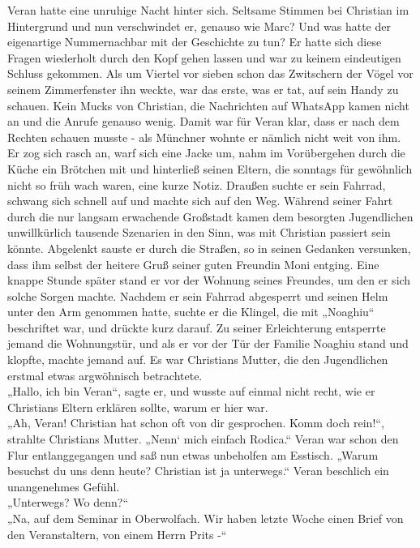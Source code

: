 \documentclass[oneside]{memoir}
\begin{document}
Veran hatte eine unruhige Nacht hinter sich. Seltsame Stimmen bei Christian im Hintergrund und nun verschwindet er, genauso wie Marc? Und was hatte der eigenartige Nummernachbar mit der Geschichte zu tun? Er hatte sich diese Fragen wiederholt durch den Kopf gehen lassen und war zu keinem eindeutigen Schluss gekommen. Als um Viertel vor sieben schon das Zwitschern der Vögel vor seinem Zimmerfenster ihn weckte, war das erste, was er tat, auf sein Handy zu schauen. Kein Mucks von Christian, die Nachrichten auf WhatsApp kamen nicht an und die Anrufe genauso wenig. Damit war für Veran klar, dass er nach dem Rechten schauen musste - als Münchner wohnte er nämlich nicht weit von ihm. Er zog sich rasch an, warf sich eine Jacke um, nahm im Vorübergehen durch die Küche ein Brötchen mit und hinterließ seinen Eltern, die sonntags für gewöhnlich nicht so früh wach waren, eine kurze Notiz. Draußen suchte er sein Fahrrad, schwang sich schnell auf und machte sich auf den Weg. Während seiner Fahrt durch die nur langsam erwachende Großstadt kamen dem besorgten Jugendlichen unwillkürlich tausende Szenarien in den Sinn, was mit Christian passiert sein könnte. Abgelenkt sauste er durch die Straßen, so in seinen Gedanken versunken, dass ihm selbst der heitere Gruß seiner guten Freundin Moni entging. Eine knappe Stunde später stand er vor der Wohnung seines Freundes, um den er sich solche Sorgen machte. Nachdem er sein Fahrrad abgesperrt und seinen Helm unter den Arm genommen hatte, suchte er die Klingel, die mit „Noaghiu“ beschriftet war, und drückte kurz darauf. Zu seiner Erleichterung entsperrte jemand die Wohnungstür, und als er vor der Tür der Familie Noaghiu stand und klopfte, machte jemand auf. Es war Christians Mutter, die den Jugendlichen erstmal etwas argwöhnisch betrachtete. \\
„Hallo, ich bin Veran“, sagte er, und wusste auf einmal nicht recht, wie er Christians Eltern erklären sollte, warum er hier war. \\
„Ah, Veran! Christian hat schon oft von dir gesprochen. Komm doch rein!“, strahlte Christians Mutter. „Nenn‘ mich einfach Rodica.“ Veran war schon den Flur entlanggegangen und saß nun etwas unbeholfen am Esstisch. „Warum besuchst du uns denn heute? Christian ist ja unterwegs.“
Veran beschlich ein unangenehmes Gefühl. \\
„Unterwegs? Wo denn?“ \\
„Na, auf dem Seminar in Oberwolfach. Wir haben letzte Woche einen Brief von den Veranstaltern, von einem Herrn Prits -“ \\
\end{document}

